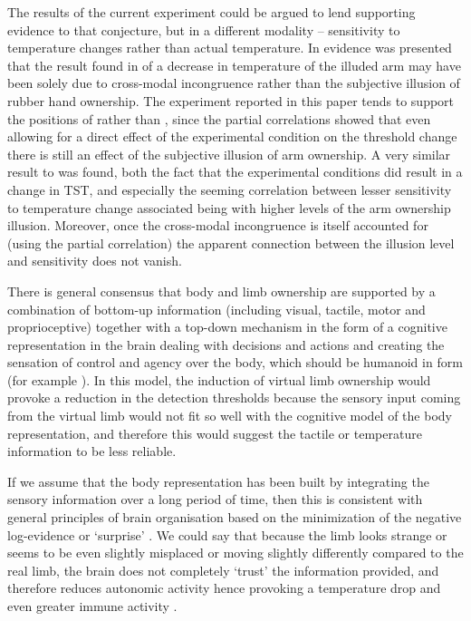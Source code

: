 \documentclass[
		twoside,openright,titlepage,numbers=noenddot,manychapters,
		headinclude,%
                footinclude=false,cleardoublepage=empty,
                BCOR=5mm,
		fontsize=11pt, %
                 enabledeprecatedfontcommands]{scrreprt}
\begin{document}
 The results of the current experiment could be argued to lend supporting evidence to that conjecture, but in a different modality – sensitivity to temperature changes rather than actual temperature. 
In \cite{Folegatti2009} evidence was presented that the result found in \cite{Moseley2008a} of a decrease in temperature of the illuded arm may have been solely due to cross-modal incongruence rather than the subjective illusion of rubber hand ownership. The experiment reported in this paper tends to support the positions of \cite{Moseley2008a} rather than \cite{Folegatti2009}, since the partial correlations showed that even allowing for a direct effect of the experimental condition on the threshold change there is still an effect of the subjective illusion of arm ownership. A very similar result to \cite{Moseley2008a} was found, both the fact that the experimental conditions did result in a change in TST, and especially the seeming correlation between lesser sensitivity to temperature change associated being with higher levels of the arm ownership illusion. Moreover, once the cross-modal incongruence is itself accounted for (using the partial correlation) the apparent connection between the illusion level and sensitivity does not vanish.

There is general consensus that body and limb ownership are supported by a combination of bottom-up information (including visual, tactile, motor and proprioceptive) together with a top-down mechanism in the form of a cognitive representation in the brain dealing with decisions and actions and creating the sensation of control and agency over the body, which should be humanoid in form (for example \cite{Tsakiris_2010}).  In this model, the induction of virtual limb ownership would provoke a reduction in the detection thresholds because the sensory input coming from the virtual limb would not fit so well with the cognitive model of the body representation, and therefore this would suggest the tactile or temperature information to be less reliable. 

If we assume that the body representation has been built by integrating the sensory information over a long period of time, then this is consistent with general principles of brain organisation based on the minimization of the negative log-evidence or ‘surprise’ \cite[]{Friston2009}. We could say that because the limb looks strange or seems to be even slightly misplaced or moving slightly differently compared to the real limb, the brain does not completely ‘trust’ the information provided, and therefore reduces autonomic activity hence provoking a temperature drop \cite[]{Moseley2008a} and even greater immune activity \cite[]{Barnsley2011}.
\end{document}
